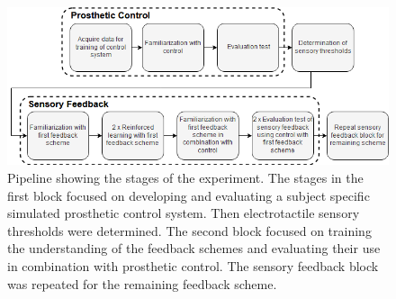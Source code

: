 \begin{figure}[h]
	
	\includegraphics[width=.85\textwidth]{figures/std_paper}
	\caption{Pipeline showing the stages of the experiment. The stages in the first block focused on developing and evaluating a subject specific simulated prosthetic control system. Then electrotactile sensory thresholds were determined. The second block focused on training the understanding of the feedback schemes and evaluating their use in combination with prosthetic control. The sensory feedback block was repeated for the remaining feedback scheme.}
	\label{fig:pa:std_pap} 
\end{figure}

